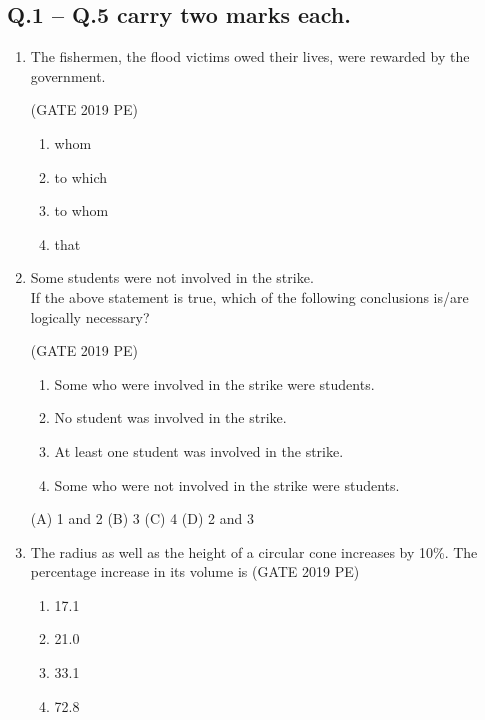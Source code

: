 \documentclass[journal,12pt,onecolumn]{exam}
\theoremstyle{remark}
\begin{document}
\subsection*{Q.1 -- Q.5 carry two marks each.}
\begin{enumerate}

    \item The fishermen, the flood victims owed their lives, were rewarded by the government.
    
    \hfill{(GATE 2019 PE)}\\
    \begin{enumerate}
        \item  whom
        \item to which
        \item  to whom
        \item that
    \end{enumerate}
   
    \item Some students were not involved in the strike.\\
    If the above statement is true, which of the following conclusions is/are logically necessary?
    
    \hfill{(GATE 2019 PE)}\\
    \begin{enumerate}
        \item Some who were involved in the strike were students.
        \item No student was involved in the strike.
        \item At least one student was involved in the strike.
        \item Some who were not involved in the strike were students.
    \end{enumerate}
    (A) 1 and 2 \hspace{1cm} (B) 3 \hspace{1cm} (C) 4 \hspace{1cm} (D) 2 and 3

    \item The radius as well as the height of a circular cone increases by 10\%. The percentage increase in its volume is
    \hfill{(GATE 2019 PE)}\\
    \begin{enumerate}
        \item 17.1
        \item 21.0
        \item 33.1 
        \item  72.8
    \end{enumerate}
   

\end{enumerate}
\end{document}

